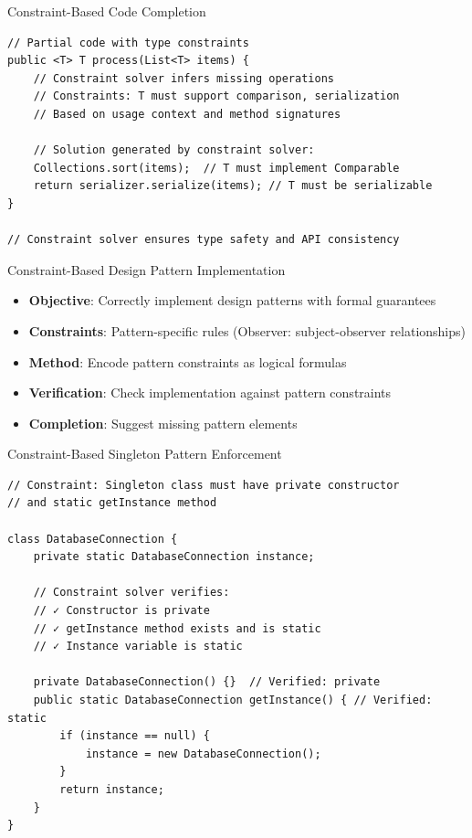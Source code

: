 \documentclass{beamer}
\begin{document}
\begin{frame}[fragile,t]{Constraint-Based Code Completion}
\begin{verbatim}
// Partial code with type constraints
public <T> T process(List<T> items) {
    // Constraint solver infers missing operations
    // Constraints: T must support comparison, serialization
    // Based on usage context and method signatures
    
    // Solution generated by constraint solver:
    Collections.sort(items);  // T must implement Comparable
    return serializer.serialize(items); // T must be serializable
}

// Constraint solver ensures type safety and API consistency
\end{verbatim}
\end{frame}

\begin{frame}[t]{Constraint-Based Design Pattern Implementation}
\begin{itemize}
\item \textbf{Objective}: Correctly implement design patterns with formal guarantees
\item \textbf{Constraints}: Pattern-specific rules (Observer: subject-observer relationships)
\item \textbf{Method}: Encode pattern constraints as logical formulas
\item \textbf{Verification}: Check implementation against pattern constraints
\item \textbf{Completion}: Suggest missing pattern elements
\end{itemize}
\end{frame}

\begin{frame}[fragile,t]{Constraint-Based Singleton Pattern Enforcement}
\begin{verbatim}
// Constraint: Singleton class must have private constructor
// and static getInstance method

class DatabaseConnection {
    private static DatabaseConnection instance;
    
    // Constraint solver verifies:
    // ✓ Constructor is private
    // ✓ getInstance method exists and is static
    // ✓ Instance variable is static
    
    private DatabaseConnection() {}  // Verified: private
    public static DatabaseConnection getInstance() { // Verified: static
        if (instance == null) {
            instance = new DatabaseConnection();
        }
        return instance;
    }
}
\end{verbatim}
\end{frame}
\end{document}
